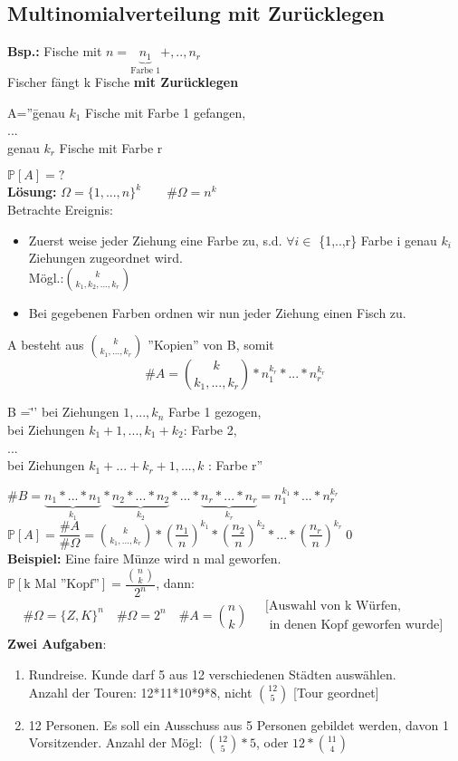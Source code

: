  	 \subsection{Multinomialverteilung mit Zurücklegen}
 	 \textbf{Bsp.:} Fische mit $n = \underbrace{n_1}_\text{Farbe 1}+,..,n_r$\\
 	 Fischer fängt k Fische \textbf{mit Zurücklegen}\\
\begin{tabbing}
	 	 A=''\= genau $k_1$ Fische mit Farbe 1 gefangen,\\
	 	 \> ...\\
	 	 \> genau $k_r$ Fische mit Farbe r
\end{tabbing}
$\mathds{P}[A] = ?$\medskip\\
\textbf{Lösung:} $\Omega = \{1,...,n\}^k \qquad \#\Omega = n^k$\\
Betrachte Ereignis:
\begin{itemize}
	\item Zuerst weise jeder Ziehung eine Farbe zu, s.d. $\forall i \in $ \{1,..,r\} Farbe i genau $k_i$ Ziehungen zugeordnet wird.\\Mögl.:$\binom{k}{k_1,k_2,...,k_r}$
	\item Bei gegebenen Farben ordnen wir nun jeder Ziehung einen Fisch zu.
\end{itemize}
A besteht aus $\binom{k}{k_1,...,k_r}$ ''Kopien'' von B, somit
$$\#A = \binom{k}{k_1,...,k_r}*n_1^{k_r}*...*n_r^{k_r}$$
\begin{tabbing}
	B =\= '' bei Ziehungen $1,...,k_n$ Farbe 1 gezogen,\\
	\> bei Ziehungen $k_1+1,...,k_1+k_2$: Farbe 2,\\
	\>...\\
	\> bei Ziehungen $k_1+...+k_r+1,...,k$ : Farbe r''
\end{tabbing}
$\#B=\underbrace{n_1*...*n_1}_{k_1}*\underbrace{n_2*...*n_2}_{k_2}*...*\underbrace{n_r*...*n_r}_{k_r} = n_1^{k_1}*...*n_r^{k_r}$\medskip\\
$\mathds{P}[A] = \dfrac{\#A}{\#\Omega}= \binom{k}{k_1,...,k_r}*\left(\dfrac{n_1}{n}\right)^{k_1}*\left(\dfrac{n_2}{n}\right)^{k_2}*...*\left(\dfrac{n_r}{n}\right)^{k_r}$\qed\medskip\\
\textbf{Beispiel:} Eine faire Münze wird n mal geworfen.\\ $\mathds{P}[\text{k Mal ''Kopf''}]= \dfrac{\binom{n}{k}}{2^n}$, dann: 
$$\#\Omega = \{Z, K\}^n\quad \#\Omega = 2^n\quad \#A=\binom{n}{k} \quad \substack{\text{[Auswahl von k Würfen,}\\\text{ in denen Kopf geworfen wurde]}}$$
\textbf{Zwei Aufgaben}:
\begin{enumerate}
	\item Rundreise. Kunde darf 5 aus 12 verschiedenen Städten auswählen.\\Anzahl der Touren: 12*11*10*9*8, nicht $\binom{12}{5}$ [Tour geordnet]
	\item 12 Personen. Es soll ein Ausschuss aus 5 Personen gebildet werden, davon 1 Vorsitzender. Anzahl der Mögl: $\binom{12}{5}*5$, oder $12*\binom{11}{4}$\end{enumerate}
 	 
